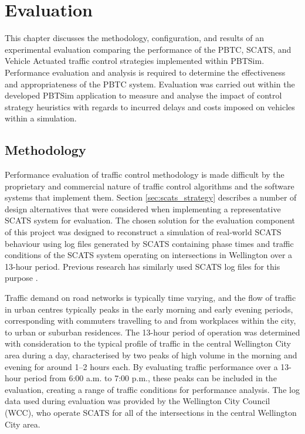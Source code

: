 \chapter{Evaluation}
\label{chapter:evaluation}

This chapter discusses the methodology, configuration, and results of an experimental evaluation comparing the performance of the PBTC, SCATS, and Vehicle Actuated traffic control strategies implemented within PBTSim. Performance evaluation and analysis is required to determine the effectiveness and appropriateness of the PBTC system. Evaluation was carried out within the developed PBTSim application to measure and analyse the impact of control strategy heuristics with regards to incurred delays and costs imposed on vehicles within a simulation.

\section{Methodology}

Performance evaluation of traffic control methodology is made difficult by the proprietary and commercial nature of traffic control algorithms and the software systems that implement them. Section \ref{sec:scats_strategy} describes a number of design alternatives that were considered when implementing a representative SCATS system for evaluation. The chosen solution for the evaluation component of this project was designed to reconstruct a simulation of real-world SCATS behaviour using log files generated by SCATS containing phase times and traffic conditions of the SCATS system operating on intersections in Wellington over a 13-hour period. Previous research has similarly used SCATS log files for this purpose \cite{wolshon1999scats}.

Traffic demand on road networks is typically time varying, and the flow of traffic in urban centres typically peaks in the early morning and early evening periods, corresponding with commuters travelling to and from workplaces within the city, to urban or suburban residences. The 13-hour period of operation was determined with consideration to the typical profile of traffic in the central Wellington City area during a day, characterised by two peaks of high volume in the morning and evening for around 1--2 hours each. By evaluating traffic performance over a 13-hour period from 6:00 a.m. to 7:00 p.m., these peaks can be included in the evaluation, creating a range of traffic conditions for performance analysis. The log data used during evaluation was provided by the Wellington City Council (WCC), who operate SCATS for all of the intersections in the central Wellington City area. 

